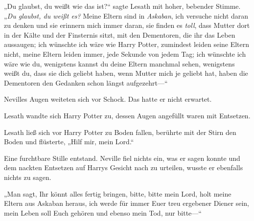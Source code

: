 „Du glaubst, du weißt wie das ist?“ sagte Lesath mit hoher, bebender Stimme. „\emph{Du glaubst, du weißt es?} Meine Eltern sind in \emph{Askaban}, ich versuche nicht daran zu denken und sie erinnern mich immer daran, sie finden es \emph{toll}, dass Mutter dort in der Kälte und der Finsternis sitzt, mit den Dementoren, die ihr das Leben aussaugen; ich wünschte ich wäre wie Harry Potter, zumindest leiden seine Eltern nicht, meine Eltern leiden immer, jede Sekunde von jedem Tag; ich wünschte ich wäre wie du, wenigstens kannst du deine Eltern manchmal sehen, wenigstens weißt du, dass sie dich geliebt haben, wenn Mutter mich je geliebt hat, haben die Dementoren den Gedanken schon längst aufgezehrt—“

Nevilles Augen weiteten sich vor Schock. Das hatte er nicht erwartet.

Lesath wandte sich Harry Potter zu, dessen Augen angefüllt waren mit Entsetzen.

Lesath ließ sich vor Harry Potter zu Boden fallen, berührte mit der Stirn den Boden und flüsterte, „Hilf mir, mein Lord.“

Eine furchtbare Stille entstand. Neville fiel nichts ein, was er sagen konnte und dem nackten Entsetzen auf Harrys Gesicht nach zu urteilen, wusste er ebenfalls nichts zu sagen.

„Man sagt, Ihr könnt alles fertig bringen, bitte, bitte mein Lord, holt meine Eltern aus Askaban heraus, ich werde für immer Euer treu ergebener Diener sein, mein Leben soll Euch gehören und ebenso mein Tod, nur bitte—“

